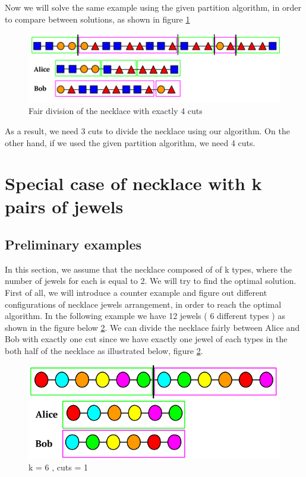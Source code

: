 \documentclass[a4paper,10pt]{article}
\begin{document}
Now we will solve the same example using the given partition algorithm, in order to compare between solutions, as shown in figure \ref{14}
\begin{figure}[H]
  \centering
\includegraphics[scale=.42]{sophisticated_using_partition.png}
\caption{Fair division of the necklace with exactly 4 cuts}
\label{14}
\end{figure}

As a result, we need 3 cuts to divide the necklace using our algorithm. On the other hand, if we used the given partition algorithm, we need 4 cuts.




\section{Special case of necklace with k pairs of jewels}
\subsection{Preliminary examples  }
In this section, we assume that the necklace composed of of k types, where the number of jewels for each is equal to 2. We will try to find the optimal solution. First of all, we will introduce a counter example and figure out different configurations of necklace jewels arrangement, in order to reach the optimal algorithm. In the following example we have 12 jewels ( 6 different types ) as shown in the figure below \ref{15}. We can divide the necklace fairly between Alice and Bob with exactly one cut since we have exactly one jewel of each types in the both half of the necklace as illustrated below, figure \ref{15}.

\begin{figure}[H]
  \centering
\includegraphics[scale=.45]{k=6, cuts = 1.png}
\caption{k = 6 , cuts = 1}
\label{15}
\end{figure}
\end{document}
